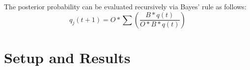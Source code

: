 \documentclass[12pt]{report} %
\begin{document}
The posterior probability can be evaluated recursively via Bayes’ rule as follows:
\begin{equation}
q_j(t+1) = O \ast \sum \left( \frac{B \ast q(t)}{O \ast B \ast q(t)} \right)
\end{equation}




\chapter{Setup and Results}




\clearpage
{}
\printbibliography




\end{document}
